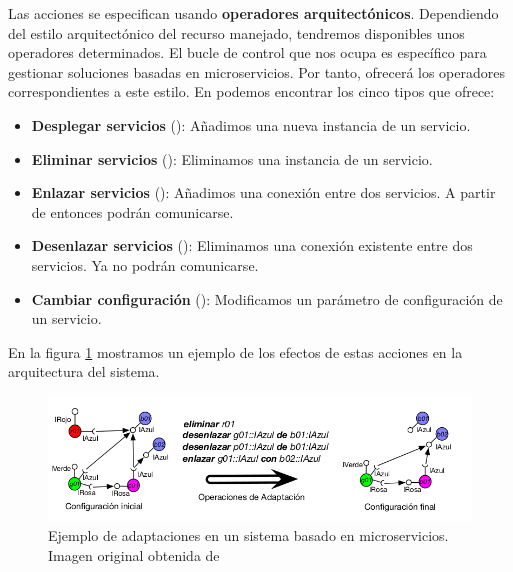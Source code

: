 Las acciones se especifican usando \textbf{operadores arquitectónicos}. \cite{garlanIncreasingSystemDependability2003} Dependiendo del estilo arquitectónico del recurso manejado, tendremos disponibles unos operadores determinados. El bucle de control que nos ocupa es específico para gestionar soluciones basadas en microservicios. Por tanto, ofrecerá los operadores correspondientes a este estilo. En \cite{fonsEspecificacionSistemasAutoadaptativos2021} podemos encontrar los cinco tipos que ofrece:

\begin{itemize}
  \item \textbf{Desplegar servicios} (\textbf{}): Añadimos una nueva instancia de un servicio.

  \item \textbf{Eliminar servicios} (\textbf{}): Eliminamos una instancia de un servicio.

  \item \textbf{Enlazar servicios} (\textbf{}): Añadimos una conexión entre dos servicios. A partir de entonces podrán comunicarse.

  \item \textbf{Desenlazar servicios} (\textbf{}): Eliminamos una conexión existente entre dos servicios. Ya no podrán comunicarse.

  \item \textbf{Cambiar configuración} (\textbf{}): Modificamos un parámetro de configuración de un servicio.
\end{itemize}

En la figura \ref{fig:adaptaciones-microservicios} mostramos un ejemplo de los efectos de estas acciones en la arquitectura del sistema.

\begin{figure}[htb]
  \centering
  \includegraphics[scale=1.8]{cap_sistema_original/images/adaptaciones}
  \caption[Ejemplo de adaptaciones en un sistema basado en microservicios.]{Ejemplo de adaptaciones en un sistema basado en microservicios. Imagen original obtenida de \cite{fonsServiciosAdaptivereadyPara2021}}
  \label{fig:adaptaciones-microservicios}
\end{figure}

